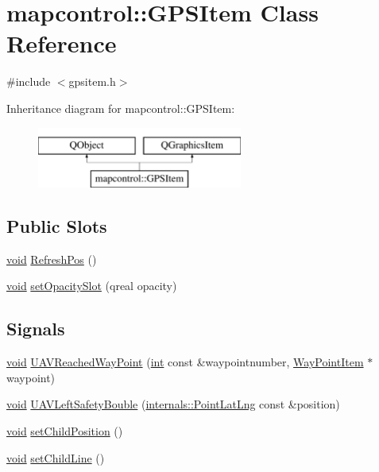 \hypertarget{classmapcontrol_1_1_g_p_s_item}{\section{mapcontrol\-:\-:G\-P\-S\-Item Class Reference}
\label{classmapcontrol_1_1_g_p_s_item}
}


{\ttfamily \#include $<$gpsitem.\-h$>$}

Inheritance diagram for mapcontrol\-:\-:G\-P\-S\-Item\-:\begin{figure}[H]
\begin{center}
\leavevmode
\includegraphics[height=2.000000cm]{classmapcontrol_1_1_g_p_s_item}
\end{center}
\end{figure}
\subsection*{Public Slots}
\begin{DoxyCompactItemize}
\item 
\hyperlink{group___u_a_v_objects_plugin_ga444cf2ff3f0ecbe028adce838d373f5c}{void} \hyperlink{group___o_p_map_widget_gab998fe4c6c60b16ae2caceafa1f08edc}{Refresh\-Pos} ()
\item 
\hyperlink{group___u_a_v_objects_plugin_ga444cf2ff3f0ecbe028adce838d373f5c}{void} \hyperlink{group___o_p_map_widget_ga877e61b6ded2fb2da63d23538e7bb089}{set\-Opacity\-Slot} (qreal opacity)
\end{DoxyCompactItemize}
\subsection*{Signals}
\begin{DoxyCompactItemize}
\item 
\hyperlink{group___u_a_v_objects_plugin_ga444cf2ff3f0ecbe028adce838d373f5c}{void} \hyperlink{group___o_p_map_widget_ga1631e3c57b806164009c3cf0b06bc32e}{U\-A\-V\-Reached\-Way\-Point} (\hyperlink{ioapi_8h_a787fa3cf048117ba7123753c1e74fcd6}{int} const \&waypointnumber, \hyperlink{classmapcontrol_1_1_way_point_item}{Way\-Point\-Item} $\ast$waypoint)
\item 
\hyperlink{group___u_a_v_objects_plugin_ga444cf2ff3f0ecbe028adce838d373f5c}{void} \hyperlink{group___o_p_map_widget_ga1ff02a44dc75d4a1e4b596c525cdd01c}{U\-A\-V\-Left\-Safety\-Bouble} (\hyperlink{structinternals_1_1_point_lat_lng}{internals\-::\-Point\-Lat\-Lng} const \&position)
\item 
\hyperlink{group___u_a_v_objects_plugin_ga444cf2ff3f0ecbe028adce838d373f5c}{void} \hyperlink{group___o_p_map_widget_ga049682502601e7325ec7d23d8a01bf5c}{set\-Child\-Position} ()
\item 
\hyperlink{group___u_a_v_objects_plugin_ga444cf2ff3f0ecbe028adce838d373f5c}{void} \hyperlink{group___o_p_map_widget_gab1b84f9c892548a9994f0e69cc0be466}{set\-Child\-Line} ()
\end{DoxyCompactItemize}


